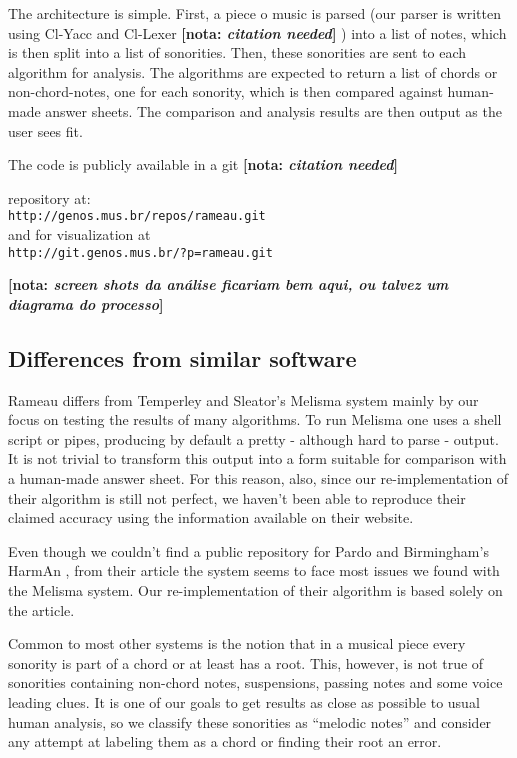 \documentclass{article}
\newcommand{\nota}[1]{
  \textbf{[nota: \textit{#1}]}
}
\begin{document}
The architecture is simple. First, a piece o music is parsed (our
parser is written using Cl-Yacc and Cl-Lexer \nota{citation needed})
into a list of notes, which is then split into a list of
sonorities. Then, these sonorities are sent to each algorithm for
analysis. The algorithms are expected to return a list of chords or
non-chord-notes, one for each sonority, which is then compared against
human-made answer sheets. The comparison and analysis results are
then output as the user sees fit.

The code is publicly available in a git \nota{citation needed}
repository at:\\
\texttt{http://genos.mus.br/repos/rameau.git}\\
and for visualization at\\
\texttt{http://git.genos.mus.br/?p=rameau.git}

\nota{screen shots da análise ficariam bem aqui, ou talvez um diagrama
  do processo}

\subsection{Differences from similar software}
\label{sec:differences-from-similar-software}

Rameau differs from Temperley and Sleator's Melisma
\cite{temperley99:modeling} system mainly by our focus on testing the
results of many algorithms. To run Melisma one uses a shell script or
pipes, producing by default a pretty - although hard to parse -
output. It is not trivial to transform this output into a form
suitable for comparison with a human-made answer sheet. For this
reason, also, since our re-implementation of their algorithm is still
not perfect, we haven't been able to reproduce their claimed accuracy
using the information available on their website.

Even though we couldn't find a public repository for Pardo and
Birmingham's HarmAn \cite{pardo99:automated}, from their article the
system seems to face most issues we found with the Melisma system. Our
re-implementation of their algorithm is based solely on the article.

Common to most other systems is the notion that in a musical piece
every sonority is part of a chord or at least has a root. This,
however, is not true of sonorities containing non-chord notes,
suspensions, passing notes and some voice leading clues. It is one of
our goals to get results as close as possible to usual human analysis,
so we classify these sonorities as ``melodic notes'' and consider any
attempt at labeling them as a chord or finding their root an error.
 
\end{document}
